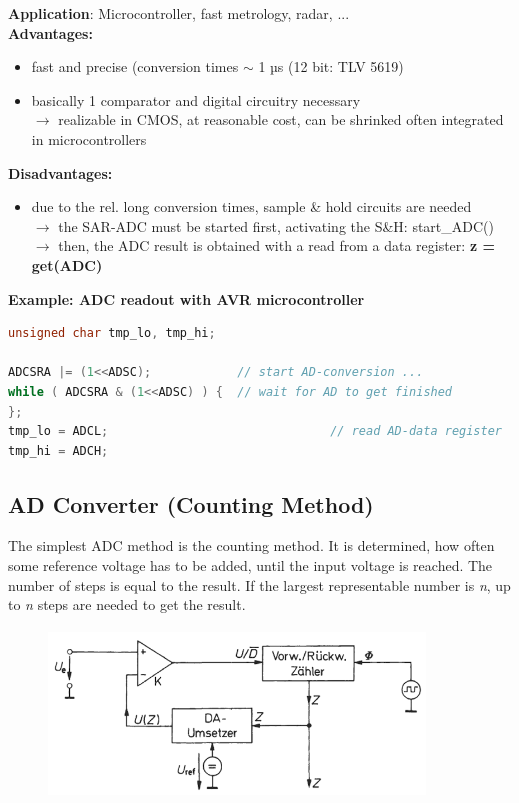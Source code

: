 \textbf{Application}: Microcontroller, fast metrology, radar, ...\\

\textbf{Advantages: }

\begin{itemize}
\item fast and precise (conversion times $\mathrm{\sim}$ 1 µs (12 bit: TLV 5619)
\item  basically 1 comparator and digital circuitry necessary  \\
$\rightarrow$ realizable in CMOS, at reasonable cost, can be shrinked often integrated in microcontrollers
\end{itemize}

\textbf{Disadvantages: }

\begin{itemize}
\item \textbf{ }due to the rel. long conversion times, sample \& hold circuits are needed \\
$\rightarrow$ the SAR-ADC must be started first, activating the S\&H:     start\_ADC()  \\
$\rightarrow$ then, the ADC result is obtained with a read from a data register:   \textbf{z = get(ADC)}
\end{itemize}

\textbf{Example: ADC readout with AVR microcontroller}\\

\begin{lstlisting}[style=mystyle, language=c]
unsigned char tmp_lo, tmp_hi;

ADCSRA |= (1<<ADSC);            // start AD-conversion ...
while ( ADCSRA & (1<<ADSC) ) {  // wait for AD to get finished
};
tmp_lo = ADCL;  							 // read AD-data register
tmp_hi = ADCH;

\end{lstlisting}

\subsection{AD Converter (Counting Method)}

The simplest ADC method is the counting method. It is determined, how often some  reference voltage has to be added, until the input voltage is reached. The number of steps is equal to the result. If the largest representable number is \textit{n}, up to \textit{n} steps are needed to get the result.

    \begin{figure}[h]
    \centering
    \includegraphics[width=10cm, height=4.5cm]{Images/image39.png}
    \label{fig:Fig 132}
    \end{figure}

